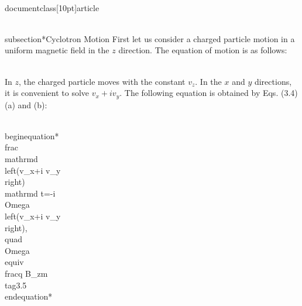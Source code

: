 \\documentclass[10pt]{article}
\begin{document}
\\subsection*{Cyclotron Motion}
First let us consider a charged particle motion in a uniform magnetic field in the $z$ direction. The equation of motion is as follows:

\\[
\\left.\\begin{array}{l}
\\text { (a) } m \\frac{\\mathrm{d} v_{x}}{\\mathrm{~d} t}=q v_{y} B_{z}  \\tag{3.4}\\\\
\\text { (b) } m \\frac{\\mathrm{d} v_{y}}{\\mathrm{~d} t}=-q v_{x} B_{z} \\\\
\\text { (c) } m \\frac{\\mathrm{d} v_{z}}{\\mathrm{~d} t}=0
\\end{array}\\right\\}
\\]

In $z$, the charged particle moves with the constant $v_{z}$. In the $x$ and $y$ directions, it is convenient to solve $v_{x}+i v_{y}$. The following equation is obtained by Eqs. (3.4) (a) and (b):


\\begin{equation*}
\\frac{\\mathrm{d}\\left(v_{x}+i v_{y}\\right)}{\\mathrm{d} t}=-i \\Omega\\left(v_{x}+i v_{y}\\right), \\quad \\Omega \\equiv \\frac{q B_{z}}{m} \\tag{3.5}
\\end{equation*}
\end{document}
